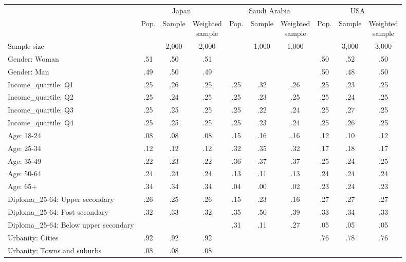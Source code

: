 
\begin{tabular}[t]{lccccccccc}
\toprule
\multicolumn{1}{c}{} & \multicolumn{3}{c}{Japan} & \multicolumn{3}{c}{Saudi Arabia} & \multicolumn{3}{c}{USA} \\
\cmidrule(l{3pt}r{3pt}){2-4} \cmidrule(l{3pt}r{3pt}){5-7} \cmidrule(l{3pt}r{3pt}){8-10}
  & Pop. & Sample & \makecell{Weighted\\sample} & Pop. & Sample & \makecell{Weighted\\sample} & Pop. & Sample & \makecell{Weighted\\sample}\\
\midrule
Sample size &  & 2,000 & 2,000 &  & 1,000 & 1,000 &  & 3,000 & 3,000\\
\addlinespace
Gender: Woman & .51 & .50 & .51 &  &  &  & .50 & .52 & .50\\
Gender: Man & .49 & .50 & .49 &  &  &  & .50 & .48 & .50\\
\addlinespace
Income\_quartile: Q1 & .25 & .26 & .25 & .25 & .32 & .26 & .25 & .23 & .25\\
Income\_quartile: Q2 & .25 & .24 & .25 & .25 & .23 & .25 & .25 & .24 & .25\\
Income\_quartile: Q3 & .25 & .25 & .25 & .25 & .22 & .24 & .25 & .27 & .25\\
Income\_quartile: Q4 & .25 & .25 & .25 & .25 & .23 & .24 & .25 & .26 & .25\\
\addlinespace
Age: 18-24 & .08 & .08 & .08 & .15 & .16 & .16 & .12 & .10 & .12\\
Age: 25-34 & .12 & .12 & .12 & .32 & .35 & .32 & .17 & .18 & .17\\
Age: 35-49 & .22 & .23 & .22 & .36 & .37 & .37 & .25 & .24 & .25\\
Age: 50-64 & .24 & .24 & .24 & .13 & .11 & .13 & .24 & .24 & .24\\
Age: 65+ & .34 & .34 & .34 & .04 & .00 & .02 & .23 & .24 & .23\\
\addlinespace
Diploma\_25-64: Upper secondary & .26 & .25 & .26 & .15 & .23 & .16 & .27 & .27 & .27\\
Diploma\_25-64: Post secondary & .32 & .33 & .32 & .35 & .50 & .39 & .33 & .34 & .33\\
Diploma\_25-64: Below upper secondary &  &  &  & .31 & .11 & .27 & .05 & .05 & .05\\
\addlinespace
Urbanity: Cities & .92 & .92 & .92 &  &  &  & .76 & .78 & .76\\
Urbanity: Towns and suburbs & .08 & .08 & .08 &  &  &  &  &  & \\

\end{tabular}
